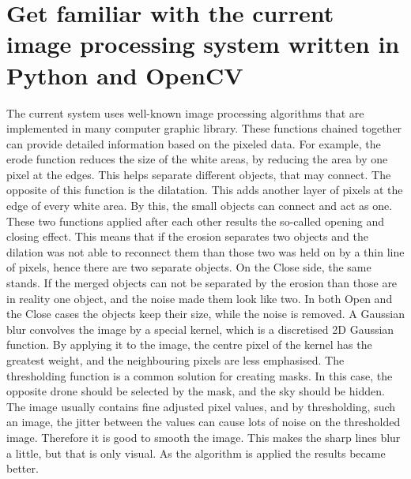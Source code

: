 \section{Get familiar with the current image processing system written in Python and OpenCV} %
The current system uses well-known image processing algorithms that are implemented in many computer graphic library.
These functions chained together can provide detailed information based on the pixeled data.
For example, the erode function reduces the size of the white areas, by reducing the area by one pixel at the edges.
This helps separate different objects, that may connect.
The opposite of this function is the dilatation.
This adds another layer of pixels at the edge of every white area.
By this, the small objects can connect and act as one.
These two functions applied after each other results the so-called opening and closing effect.
This means that if the erosion separates two objects and the dilation was not able to reconnect them than those two was held on by a thin line of pixels, hence there are two separate objects.
On the Close side, the same stands.
If the merged objects can not be separated by the erosion than those are in reality one object, and the noise made them look like two.
In both Open and the Close cases the objects keep their size, while the noise is removed.
A Gaussian blur convolves the image by a special kernel, which is a discretised 2D Gaussian function.
By applying it to the image, the centre pixel of the kernel has the greatest weight, and the neighbouring pixels are less emphasised.
The thresholding function is a common solution for creating masks.
In this case, the opposite drone should be selected by the mask, and the sky should be hidden.
The image usually contains fine adjusted pixel values, and by thresholding, such an image, the jitter between the values can cause lots of noise on the thresholded image.
Therefore it is good to smooth the image.
This makes the sharp lines blur a little, but that is only visual.
As the algorithm is applied the results became better.

